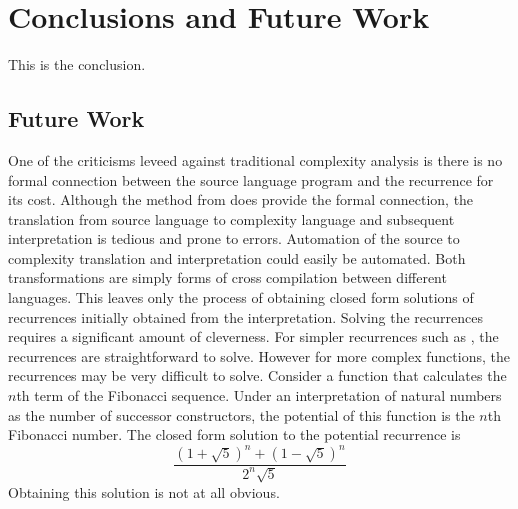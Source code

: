 \chapter{Conclusions and Future Work}

This is the conclusion.

\section{Future Work}
One of the criticisms leveed against traditional complexity analysis is there
is no formal connection between the source language program and the recurrence
for its cost. Although the method from \citet{Danner2015} does provide the
formal connection, the translation from source language to complexity language
and subsequent interpretation is tedious and prone to errors. Automation of the
source to complexity translation and interpretation could easily be automated.
Both transformations are simply forms of cross compilation between different
languages. This leaves only the process of obtaining closed form solutions of
recurrences initially obtained from the interpretation. Solving the recurrences
requires a significant amount of cleverness. For simpler recurrences such as
, the recurrences are straightforward to solve. However for more
complex functions, the recurrences may be very difficult to solve. Consider a
function that calculates the $n$th term of the Fibonacci sequence. Under an
interpretation of natural numbers as the number of successor constructors, the
potential of this function is the $n$th Fibonacci number. The closed form
solution to the potential recurrence is
\[
  \frac{(1 + \sqrt{5})^n + (1 - \sqrt{5})^n}{2^n\sqrt{5}}
\]
Obtaining this solution is not at all obvious.
